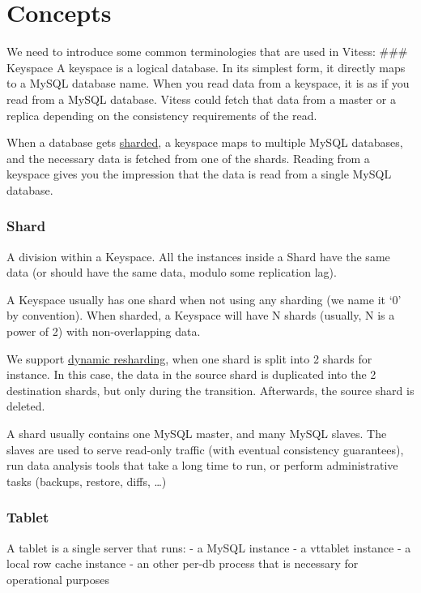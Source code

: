 \documentclass{scrartcl}
\begin{document}
\section{Concepts}\hypertarget{concepts}{}\label{concepts}

We need to introduce some common terminologies that are used in Vitess:
\#\#\# Keyspace
A keyspace is a logical database.
In its simplest form, it directly maps to a MySQL database name.
When you read data from a keyspace, it is as if you read from a MySQL database.
Vitess could fetch that data from a master or a replica depending
on the consistency requirements of the read.

When a database gets \href{http://en.wikipedia.org/wiki/Shard\_(database\_architecture)}{sharded},
a keyspace maps to multiple MySQL databases,
and the necessary data is fetched from one of the shards.
Reading from a keyspace gives you the impression that the data is read from
a single MySQL database.

\subsubsection{Shard}\hypertarget{shard}{}\label{shard}

A division within a Keyspace. All the instances inside a Shard have the same data (or should have the same data,
modulo some replication lag).

A Keyspace usually has one shard when not using any sharding (we name it `0' by convention). When sharded, a Keyspace will have N shards (usually, N is a power of 2) with non-overlapping data.

We support \href{Resharding.markdown}{dynamic resharding}, when one shard is split into 2 shards for instance. In this case, the data in the
source shard is duplicated into the 2 destination shards, but only during the transition. Afterwards, the source shard is
deleted.

A shard usually contains one MySQL master, and many MySQL slaves. The slaves are used to serve read-only traffic (with
eventual consistency guarantees), run data analysis tools that take a long time to run, or perform administrative tasks (backups, restore, diffs, \ldots{})

\subsubsection{Tablet}\hypertarget{tablet}{}\label{tablet}

A tablet is a single server that runs:
- a MySQL instance
- a vttablet instance
- a local row cache instance
- an other per-db process that is necessary for operational purposes
\end{document}

